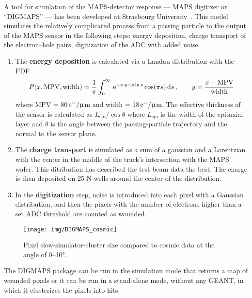 A tool for simulation of the MAPS-detector response --- MAPS digitizer or ``DIGMAPS'' --- has been developed at Strasbourg University~\cite{DIGMAPS}\@. This model simulates the relatively complicated process from a passing particle to the output of the MAPS sensor in the following steps: energy deposition, charge transport of the electron--hole pairs, digitization of the ADC with added noise.
\begin{enumerate}
 \item The \textbf{energy deposition} is calculated via a Landau distribution with the PDF~\cite{Landau}
 \begin{equation}
  P(x,\mathrm{MPV},\mathrm{width}) = \frac{1}{\pi}\int^{\infty}_{0}\, \mathrm{e}^{-s\cdot y - s\ln s} \cos(\pi s)\,\mathrm{d} s \,,\qquad y=\frac{x-\mathrm{MPV}}{\mathrm{width}}
 \end{equation}
 where MPV = 80$\,\mathrm{e}^-/\upmu$m and width = 18$\,\mathrm{e}^-/\upmu$m.
The effective thickness of the sensor is calculated as $L_\mathrm{epi}/\cos \theta$ where $L_\mathrm{epi}$ is the width of the epitaxial layer and $\theta$ is the angle between the passing-particle trajectory and the normal to the sensor plane.
 \item The \textbf{charge transport} is simulated as a sum of a gaussian and a Lorentzian with the center in the middle of the track's intersection with the MAPS wafer. This ditribution has described the test beam data the best. The charge is then deposited on 25 N-wells around the center of the distribution.
 \item In the \textbf{digitization} step, noise is introduced into each pixel with a Gaussian distribution, and then the pixels with the number of electrons higher than a set ADC threshold are counted as wounded.
\end{enumerate}

\begin{figure}[!htb]
\begin{center}
 \texttt{[image: img/DIGMAPS\_cosmic]}\\
\end{center}
\caption[Pixel slow-simulator-cluster size compared to cosmic data at the angle of 0--10°.]{\label{cosmicDigmaps}Pixel slow-simulator-cluster size compared to cosmic data at the angle of 0--10°.}
\end{figure}

The DIGMAPS package can be run in the simulation mode that returns a map of wounded pixels or it can be run in a stand-alone mode, without any GEANT, in which it clusterizes the pixels into hits.


